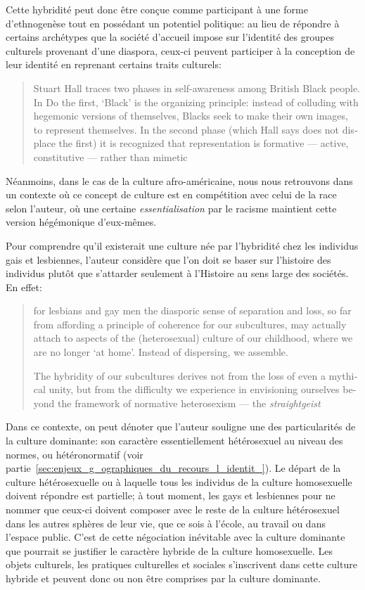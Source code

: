 Cette hybridité peut donc être conçue comme participant à une forme d'ethnogenèse tout en possédant un potentiel politique: au lieu de répondre à certains archétypes que la société d'accueil impose sur l'identité des groupes culturels provenant d'une diaspora, ceux-ci peuvent participer à la conception de leur identité en reprenant certains traits culturels:
\foreignblockquote{english}[{\cite[277]{Sinfield1996}}][.]{Stuart Hall traces
  two phases in self-awareness among British Black people. In Do the first,
  `Black' is the organizing principle: instead of colluding with hegemonic
  versions of themselves, Blacks seek to make their own images, to represent
  themselves. In the second phase (which Hall says does not displace the first)
  it is recognized that representation is formative --- active, constitutive ---
  rather than mimetic}.
Néanmoins, dans le cas de la culture afro-américaine, nous nous retrouvons dans un contexte où ce concept de culture est en compétition avec celui de la race selon l'auteur, où une certaine \emph{essentialisation} par le racisme maintient cette version hégémonique d'eux-mêmes.

Pour comprendre qu'il existerait une culture née par l'hybridité chez les individus gais et lesbiennes, l'auteur considère que l'on doit se baser sur l'histoire des individus plutôt que s'attarder seulement à l'Histoire au sens large des sociétés. 
En effet:
\foreignblockquote{english}[{\cite[280]{Sinfield1996}}][.]{\textelp{} for lesbians
  and gay men the diasporic sense of separation and loss, so far from affording
  a principle of coherence for our subcultures, may actually attach to aspects
  of the (heterosexual) culture of our childhood, where we are no longer `at
  home'. Instead of dispersing, we assemble.

  The hybridity of our subcultures derives not from the loss of even a mythical
  unity, but from the difficulty we experience in envisioning ourselves beyond
  the framework of normative heterosexism --- the \emph{straightgeist} \textelp{}}
Dans ce contexte, on peut dénoter que l'auteur souligne une des particularités de la culture dominante: son caractère essentiellement hétérosexuel au niveau des normes, ou hétéronormatif (voir partie~\ref{sec:enjeux_g_ographiques_du_recours_l_identit_}). 
Le départ de la culture hétérosexuelle ou  à laquelle tous les individus de la culture homosexuelle doivent répondre est partielle; à tout moment, les gays et lesbiennes pour ne nommer que ceux-ci doivent composer avec le reste de la culture hétérosexuel dans les autres sphères de leur vie, que ce sois à l'école, au travail ou dans l'espace public. 
C'est de cette négociation inévitable avec la culture dominante que pourrait se justifier le caractère hybride de la culture homosexuelle. 
Les objets culturels, les pratiques culturelles et sociales s'inscrivent dans cette culture hybride et peuvent donc ou non être comprises par la culture dominante.


